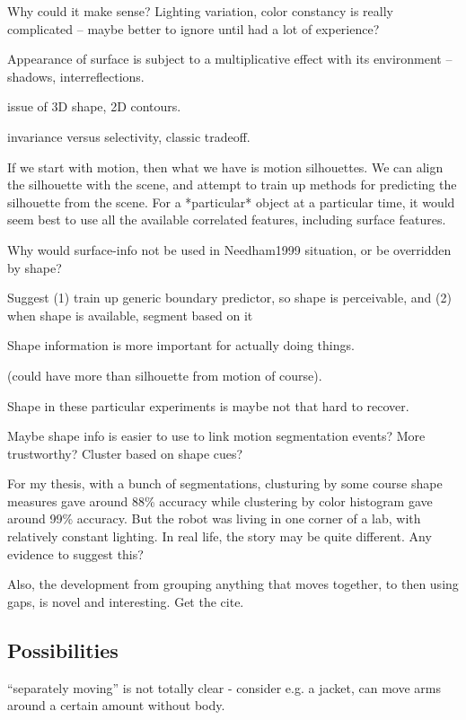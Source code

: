 Why could it make sense?  Lighting variation, color constancy is
really complicated -- maybe better to ignore until had a lot
of experience?

Appearance of surface is subject to a multiplicative effect
with its environment -- shadows, interreflections.

issue of 3D shape, 2D contours.

invariance versus selectivity, classic tradeoff.

If we start with motion, then what we have is motion silhouettes.
We can align the silhouette with the scene, and attempt to train
up methods for predicting the silhouette from the scene.
For a *particular* object at a particular time, it would seem 
best to use all the available correlated features, including 
surface features.  

Why would surface-info not be used in Needham1999 situation,
or be overridden by shape?

Suggest (1) train up generic boundary predictor, so
shape is perceivable, and (2) when shape is available,
segment based on it

Shape information is more important for actually doing things.

(could have more than silhouette from motion of course).


Shape in these particular experiments is maybe not that hard to
recover.

Maybe shape info is easier to use to link motion segmentation
events?  More trustworthy?  Cluster based on shape cues?

For my thesis, with a bunch of segmentations, clusturing by
some course shape measures gave around 88\% accuracy while
clustering by color histogram gave around 99\% accuracy.
But the robot was living in one corner of a lab, with 
relatively constant lighting.  In real life, the story may
be quite different.  Any evidence to suggest this?

Also, the development from grouping anything that moves
together, to then using gaps, is novel and interesting.
Get the cite.




\subsection{Possibilities}

``separately moving'' is not totally clear - consider e.g. a 
jacket, can move arms around a certain amount without body.

